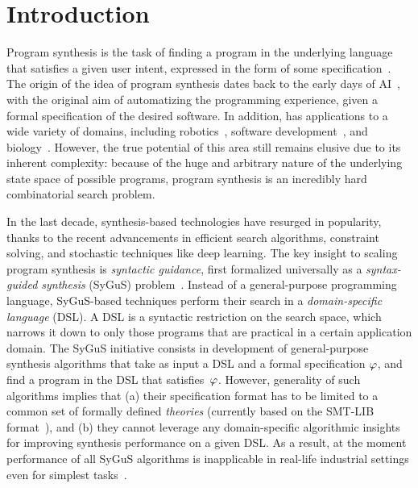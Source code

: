 \chapter{Introduction}
\label{ch:intro}

Program synthesis is the task of finding a program in the underlying language that satisfies a given user intent,
expressed in the form of some specification~\cite{gulwani2010dimensions}.
The origin of the idea of program synthesis dates back to the early days of AI~\cite{green69,waldinger69}, with the
original aim of automatizing the programming experience, given a formal specification of the desired software.
In addition, has applications to a wide variety of domains,
including robotics~\cite{kuniyoshi1994learning}, software development~\cite{kuncak2012software}, and
biology~\cite{synthesis:biological}.
However, the true potential of this area still remains elusive due to its inherent complexity:
because of the huge and arbitrary nature of the underlying state space of possible programs, program synthesis is
an incredibly hard combinatorial search problem.

In the last decade, synthesis-based technologies have resurged in popularity,
thanks to the recent advancements in efficient search algorithms, constraint solving, and stochastic techniques like
deep learning.
The key insight to scaling program synthesis is \emph{syntactic guidance}, first formalized universally as a
\emph{syntax-guided synthesis} (SyGuS) problem~\cite{sygus}.
Instead of a general-purpose programming language, SyGuS-based techniques perform their search in a
\emph{domain-specific language} (DSL).
A DSL is a syntactic restriction on the search space, which narrows it down to only those programs that are practical in
a certain application domain.
The SyGuS initiative consists in development of general-purpose synthesis algorithms that take as input a DSL and a
formal specification $\varphi$, and find a program in the DSL that satisfies~$\varphi$.
However, generality of such algorithms implies that (a) their specification format has to be limited to a common set of
formally defined \emph{theories} (currently based on the SMT-LIB format~\cite{smtlib}), and (b) they cannot leverage any
domain-specific algorithmic insights for improving synthesis performance on a given DSL.
As a result, at the moment performance of all SyGuS algorithms is inapplicable in real-life industrial settings even for
simplest tasks~\cite{bodik:layout,andersen:procedural,singh2012synthesizing}.

